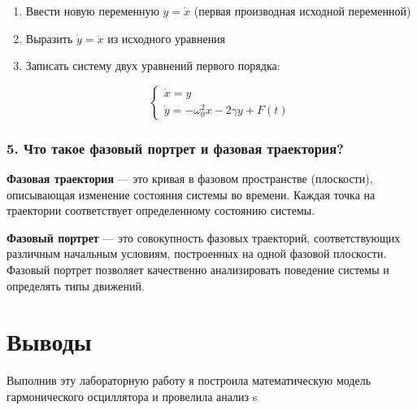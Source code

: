 \documentclass[
  12pt,
  a4paper,
  DIV=11,
  numbers=noendperiod]{scrreprt}
\begin{document}
\begin{enumerate}
\def\labelenumi{\arabic{enumi}.}
\item
  Ввести новую переменную \(y = \dot{x}\) (первая производная исходной
  переменной)
\item
  Выразить \(\dot{y} = \ddot{x}\) из исходного уравнения
\item
  Записать систему двух уравнений первого порядка:

  \[
  \begin{cases}
  \dot{x} = y \\
  \dot{y} = -\omega_0^2 x - 2\gamma y + F(t)
  \end{cases}
  \]
\end{enumerate}

\subsection{5. Что такое фазовый портрет и фазовая
траектория?}\label{ux447ux442ux43e-ux442ux430ux43aux43eux435-ux444ux430ux437ux43eux432ux44bux439-ux43fux43eux440ux442ux440ux435ux442-ux438-ux444ux430ux437ux43eux432ux430ux44f-ux442ux440ux430ux435ux43aux442ux43eux440ux438ux44f}

\textbf{Фазовая траектория} --- это кривая в фазовом пространстве
(плоскости), описывающая изменение состояния системы во времени. Каждая
точка на траектории соответствует определенному состоянию системы.

\textbf{Фазовый портрет} --- это совокупность фазовых траекторий,
соответствующих различным начальным условиям, построенных на одной
фазовой плоскости. Фазовый портрет позволяет качественно анализировать
поведение системы и определять типы движений.

\chapter{Выводы}\label{ux432ux44bux432ux43eux434ux44b}

Выполнив эту лабораторную работу я построила математическую модель
гармонического осциллятора и провелила анализ s


\printbibliography
\end{document}
